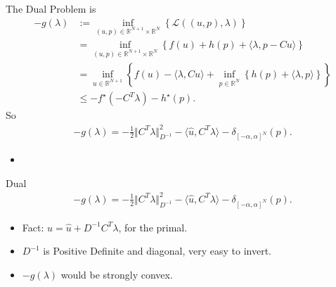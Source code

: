 \documentclass[11pt]{beamer}
\theoremstyle{definition}
\begin{document}
    \begin{frame}{The Dual Problem is}
        \begin{align*}
            - g(\lambda) &:= \inf_{(u, p)\in \mathbb R^{N + 1}\times \mathbb R^N}
            \left\lbrace
                \mathcal L({(u, p), \lambda})
            \right\rbrace
            \\
            &= \inf_{(u, p)\in \mathbb R^{N + 1}\times \mathbb R^N}
            \left\lbrace
                f(u) + h(p) + \langle \lambda, p - Cu\rangle
            \right\rbrace
            \\
            &= 
            \inf_{u\in \mathbb R^{N + 1}}
            \left\lbrace
                f(u) - \langle \lambda, Cu\rangle 
                + 
                \inf_{p\in \mathbb R^{N}}
                \left\lbrace
                    h(p) + \langle \lambda, p\rangle  
                \right\rbrace
            \right\rbrace
            \\
            &\le
            -f^\star (-C^T\lambda) - h^\star(p). 
        \end{align*}
        So 
        \begin{align*}
            - g(\lambda) = -\frac{1}{2}    \Vert C^T\lambda\Vert^2_{D^{-1}} - 
            \langle \hat u, C^T \lambda\rangle - 
            \delta_{[-\alpha, \alpha]^N}(p). 
        \end{align*}
        \begin{itemize}
            \item []
        \end{itemize}
    \end{frame}
    \begin{frame}{Dual}
        \begin{align*}
            - g(\lambda) = -\frac{1}{2}    \Vert C^T\lambda\Vert^2_{D^{-1}} - 
            \langle \hat u, C^T \lambda\rangle - 
            \delta_{[-\alpha, \alpha]^N}(p). 
        \end{align*}
        \begin{itemize}
            \item Fact: $u = \hat u + D^{-1}C^T\lambda$, for the primal. 
            \item $D^{-1}$ is Positive Definite and diagonal, very easy to invert. 
            \item $-g(\lambda)$ would be strongly convex. 
        \end{itemize}
    \end{frame}
\end{document}
